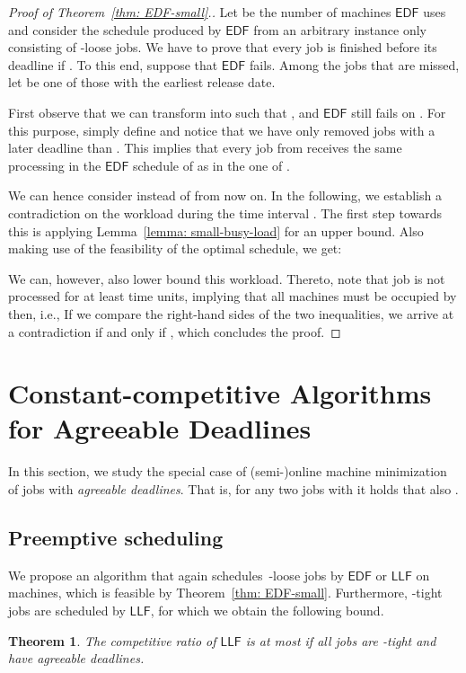 \documentclass[letterpaper,11pt]{article}
\newtheorem{theorem}{Theorem}
\newcommand{\EDF}{\ensuremath{\mathsf{EDF}}\xspace}
\newcommand{\LLF}{\ensuremath{\mathsf{LLF}}\xspace}
\begin{document}
\begin{proof}[Proof of Theorem~\ref{thm: EDF-small}.]
Let  be the number of machines \EDF uses and consider the schedule produced by \EDF from an arbitrary instance  only consisting of -loose jobs. We have to prove that every job is finished before its deadline if . To this end, suppose that \EDF fails. Among the jobs that are missed, let  be one of those with the earliest release date.

First observe that we can transform  into  such that ,  and \EDF still fails on . For this purpose, simply define  and notice that we have only removed jobs with a later deadline than . This implies that every job from  receives the same processing in the \EDF schedule of  as in the one of .

We can hence consider  instead of  from now on. In the following, we establish a contradiction on the workload during the time interval . The first step towards this is applying Lemma~\ref{lemma: small-busy-load} for an upper bound. Also making use of the feasibility of the optimal schedule, we get:

We can, however, also lower bound this workload. Thereto, note that job  is not processed for at least  time units, implying that all machines must be occupied by then, i.e.,  If we compare the right-hand sides of the two inequalities, we arrive at a contradiction if and only if , which concludes the proof.
\end{proof}


\section{Constant-competitive Algorithms for Agreeable Deadlines}
\label{sec:special-cases1}

In this section, we study the special case of (semi-)online machine minimization of jobs with {\em agreeable deadlines}. That is, for any two jobs  with  it holds that also . 

\subsection{Preemptive scheduling}

We propose an algorithm that again schedules~-loose jobs by \EDF or \LLF on  machines, which is feasible by Theorem~\ref{thm: EDF-small}. Furthermore, -tight jobs are scheduled by \LLF, for which we obtain the following bound.

\begin{theorem}\label{thm1:LLF-agreeable}
  The competitive ratio of \LLF is at most  if all jobs are -tight and have agreeable deadlines.
\end{theorem}
\end{document}
